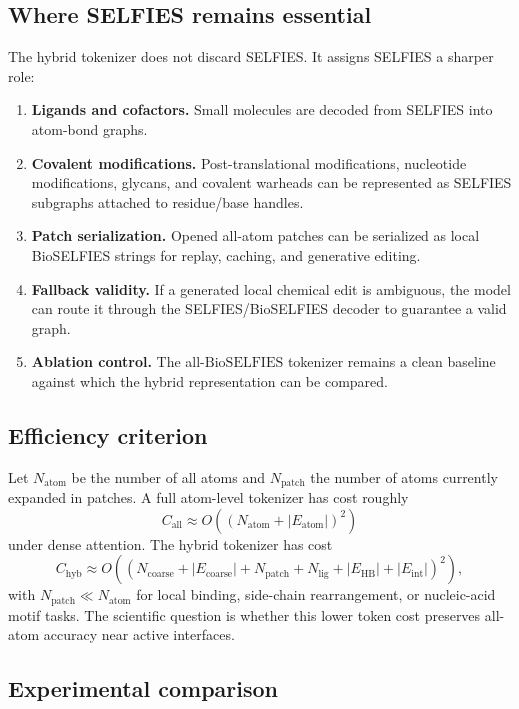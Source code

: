 \documentclass[11pt]{article}
\newcommand{\bioselfies}{\mathrm{BioSELFIES}}
\begin{document}
\subsection{Where SELFIES remains essential}

The hybrid tokenizer does not discard SELFIES. It assigns SELFIES a sharper role:
\begin{enumerate}[leftmargin=2em]
  \item \textbf{Ligands and cofactors.} Small molecules are decoded from SELFIES into atom-bond graphs.
  \item \textbf{Covalent modifications.} Post-translational modifications, nucleotide modifications, glycans, and covalent warheads can be represented as SELFIES subgraphs attached to residue/base handles.
  \item \textbf{Patch serialization.} Opened all-atom patches can be serialized as local BioSELFIES strings for replay, caching, and generative editing.
  \item \textbf{Fallback validity.} If a generated local chemical edit is ambiguous, the model can route it through the SELFIES/BioSELFIES decoder to guarantee a valid graph.
  \item \textbf{Ablation control.} The all-$\bioselfies$ tokenizer remains a clean baseline against which the hybrid representation can be compared.
\end{enumerate}

\subsection{Efficiency criterion}

Let $N_{\mathrm{atom}}$ be the number of all atoms and $N_{\mathrm{patch}}$ the number of atoms currently expanded in patches. A full atom-level tokenizer has cost roughly
\[
C_{\mathrm{all}}
\approx
O((N_{\mathrm{atom}}+|E_{\mathrm{atom}}|)^2)
\]
under dense attention. The hybrid tokenizer has cost
\[
C_{\mathrm{hyb}}
\approx
O((N_{\mathrm{coarse}}+|E_{\mathrm{coarse}}|+N_{\mathrm{patch}}+N_{\mathrm{lig}}+|E_{\mathrm{HB}}|+|E_{\mathrm{int}}|)^2),
\]
with $N_{\mathrm{patch}}\ll N_{\mathrm{atom}}$ for local binding, side-chain rearrangement, or nucleic-acid motif tasks. The scientific question is whether this lower token cost preserves all-atom accuracy near active interfaces.

\subsection{Experimental comparison}
\end{document}
